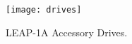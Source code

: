 \begin{figure}[H]
    \centering
    \texttt{[image: drives]}
    \caption{LEAP-1A Accessory Drives.\cite{ESM}}
    \label{fig:drives}
\end{figure}




































